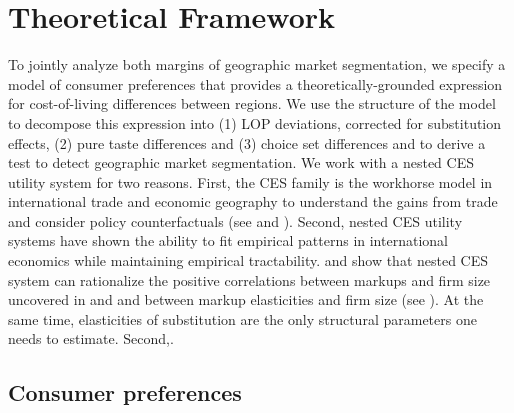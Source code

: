 \section{Theoretical Framework}\label{sec:theory}
To jointly analyze both margins of geographic market segmentation, we specify a model of consumer preferences that provides a theoretically-grounded expression for cost-of-living differences between regions. We use the structure of the model to decompose this expression into (1) LOP deviations, corrected for substitution effects, (2) pure taste differences and (3) choice set differences and to derive a test to detect geographic market segmentation. We work with a nested CES utility system for two reasons. First, the CES family is the workhorse model in international trade and economic geography to understand the gains from trade and consider policy counterfactuals (see \citet{Arkolakis2012} and \citet{Allen2020}). Second, nested CES utility systems have shown the ability to fit empirical patterns in international economics while maintaining empirical tractability. \citet{Atkeson2008} and \citet{Hottman2016} show that nested CES system can rationalize the positive correlations between markups and firm size uncovered in \citet{Deloecker2012} and \citet{Deloecker2016} and between markup elasticities and firm size (see \citet{Berman2012, Amiti2019}). At the same time, elasticities of substitution are the only structural parameters one needs to estimate. Second,. 

\subsection{Consumer preferences}
